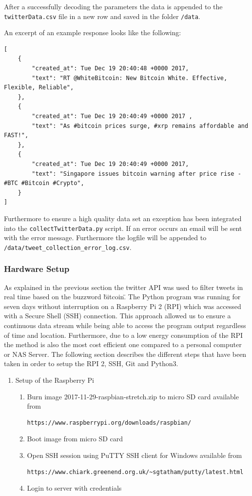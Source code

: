 \documentclass[a4paper,12pt]{article}
\begin{document}
\begin{spacing}{1.2}
After a successfully decoding the parameters the data is appended to the \verb|twitterData.csv| file in a new row and saved in the folder \verb|/data|.

An excerpt of an example response looks like the following:
\begin{lstlisting}
[
    {
        "created_at": Tue Dec 19 20:40:48 +0000 2017, 
        "text": "RT @WhiteBitcoin: New Bitcoin White. Effective, Flexible, Reliable", 
    }, 
    {
        "created_at": Tue Dec 19 20:40:49 +0000 2017 ,
        "text": "As #bitcoin prices surge, #xrp remains affordable and FAST!",
    }, 
    {
        "created_at": Tue Dec 19 20:40:49 +0000 2017, 
        "text": "Singapore issues bitcoin warning after price rise - #BTC #Bitcoin #Crypto", 
    }
]
\end{lstlisting}

Furthermore to ensure a high quality data set an exception has been integrated into the \verb|collectTwitterData.py| script. If an error occurs an email will be sent with the error message. Furthermore the logfile will be  appended to \verb|/data/tweet_collection_error_log.csv|.

\subsubsection{Hardware Setup}
As explained in the previous section the twitter API was used to filter tweets in real time based on the buzzword \"bitcoin\". The Python program was running for seven days without interruption on a Raspberry Pi 2 (RPI) which was accessed with a Secure Shell (SSH) connection. This approach allowed us to ensure a continuous data stream while being able to access the program output regardless of time and location. Furthermore, due to a low energy consumption of the RPI the method is also the most cost efficient one compared to a personal computer or NAS Server. The following section describes the different steps that have been taken in order to setup the RPI 2, SSH, Git and Python3.\newline 

\begin{enumerate}
\item Setup of the Raspberry Pi
\begin{enumerate}
\item Burn image 2017-11-29-raspbian-stretch.zip to micro SD card available from
\begin{lstlisting}[language=bash]
https://www.raspberrypi.org/downloads/raspbian/
\end{lstlisting}
\item Boot image from micro SD card 
\item Open SSH session using PuTTY SSH client for Windows available from
\begin{lstlisting}[language=bash] 
https://www.chiark.greenend.org.uk/~sgtatham/putty/latest.html
\end{lstlisting}
\item Login to server with credentials 
\end{enumerate}


\end{enumerate}
\end{spacing}
\end{document}
